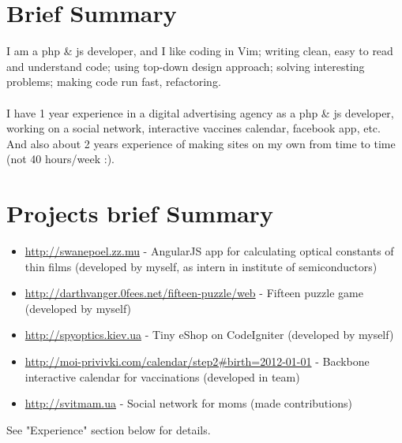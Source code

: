 \documentclass[a4paper, 14pt]{article}
\begin{document}
\begin{center}
	\textsc{\Huge{}}
\end{center}


\section{Brief Summary}
    I am a php \& js developer, and I like coding in Vim; writing clean, easy to read and understand code; using top-down design approach; solving interesting problems; making code run fast, refactoring. \\ 
    \\
    I have 1 year experience in a digital advertising agency as a php \& js developer, working on a social network, interactive vaccines calendar, facebook app, etc. \\
    And also about 2 years experience of making sites on my own from time to time (not 40 hours/week :).

\section{Projects brief Summary}
\begin{itemize}
    \item \url{http://swanepoel.zz.mu} - AngularJS app for calculating optical constants of thin films (developed by myself, as intern in institute of semiconductors)
    \\
    \item \url{http://darthvanger.0fees.net/fifteen-puzzle/web} - Fifteen puzzle game (developed by myself)
    \\
    \item \url{http://spyoptics.kiev.ua} - Tiny eShop on CodeIgniter (developed by myself)
    \\
    \item \url{http://moi-privivki.com/calendar/step2#birth=2012-01-01} - Backbone interactive calendar for vaccinations (developed in team)
    \\
    \item \url{http://svitmam.ua} - Social network for moms (made contributions)
\end{itemize}
See "Experience" section below for details.
\end{document}
